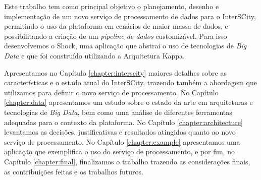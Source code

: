 Este trabalho tem como principal objetivo o planejamento, desenho e
implementação de um novo serviço de processamento de dados para o InterSCity,
permitindo o uso da plataforma em cenários de maior massa de dados, e
possibilitando a criação de um \textit{pipeline de dados} customizável. Para
isso desenvolvemos o Shock, uma aplicação que abstrai o uso de tecnologias
de \textit{Big Data} e que foi construído utilizando a Arquitetura Kappa.

Apresentamos no Capítulo \ref{chapter:interscity} maiores detalhes sobre as
características e o estado atual do InterSCity, trazendo também a abordagem que
utilizamos para definir o novo serviço de processamento. No Capítulo
\ref{chapter:data} apresentamos um estudo sobre o estado da arte em arquiteturas
e tecnologias de \textit{Big Data}, bem como uma análise de diferentes
ferramentas adequadas para o contexto da plataforma. No Capítulo
\ref{chapter:architecture} levantamos as decisões, justificativas e resultados
atingidos quanto ao novo serviço de processamento. No Capítulo
\ref{chapter:example} apresentamos uma aplicação que exemplifica o uso do serviço
de processamento, e por fim, no Capítulo
\ref{chapter:final}, finalizamos o trabalho trazendo as considerações
finais, as contribuições feitas e os trabalhos futuros.
